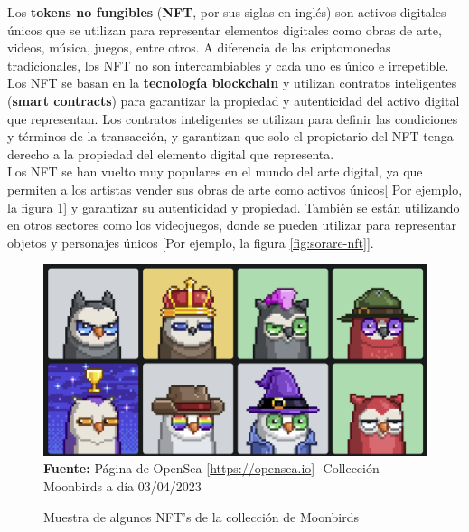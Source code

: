 \label{txt:nft}
Los \textbf{tokens no fungibles} (\textbf{NFT}, por sus siglas en inglés) son 
activos digitales únicos que se utilizan para representar elementos digitales 
como obras de arte, videos, música, juegos, entre otros. A diferencia de las 
criptomonedas tradicionales, los NFT no son intercambiables y cada uno es 
único e irrepetible.\\
\hfill \break
Los NFT se basan en la \textbf{tecnología blockchain} y utilizan contratos 
inteligentes (\textbf{smart contracts}) para garantizar la propiedad y 
autenticidad del activo digital que representan. Los contratos inteligentes 
se utilizan para definir las condiciones y términos de la transacción, y 
garantizan que solo el propietario del NFT tenga derecho a la propiedad del 
elemento digital que representa.\\
\hfill \break
Los NFT se han vuelto muy populares en el mundo del arte digital, ya que 
permiten a los artistas vender sus obras de arte como activos únicos[ 
Por ejemplo, la figura \ref*{fig:opensea-nft}] y garantizar su 
autenticidad y propiedad. También se están utilizando en otros sectores como 
los videojuegos, donde se pueden utilizar para representar objetos y personajes 
únicos [Por ejemplo, la figura \ref*{fig:sorare-nft}].\\
\hfill \break
\begin{figure}[htb!]
    \caption{Muestra de algunos NFT's de la collección de Moonbirds}
    \label{fig:opensea-nft}
    \centering
    \includegraphics[scale=0.25]{./Ilustraciones/opensea-nft.png}\\
    \textbf{Fuente:} Página de OpenSea [\url{https://opensea.io}]- Collección Moonbirds a día 03/04/2023
\end{figure}
\hfill \break
